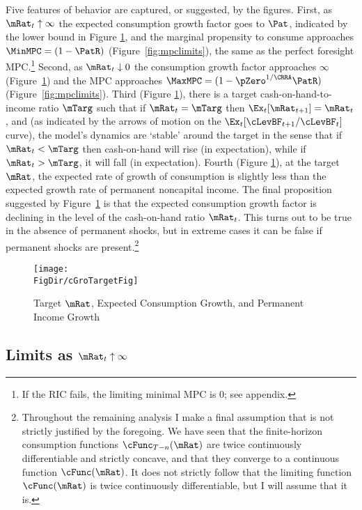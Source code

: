 \documentclass[titlepage]{\econtex}\providecommand{\texname}{BufferStockTheory}
\providecommand{\FigDir}{Figures}
\begin{document}
{Five features of behavior are captured, or suggested, by the
figures. First, as $\mRat_{t} \uparrow \infty$ the expected
consumption growth factor goes to ${\Pat}$, indicated by the lower
bound in Figure \ref{fig:cGroTargetFig}, and the marginal propensity
to consume approaches $\MinMPC=(1-\PatR)$
(Figure~\ref{fig:mpclimits}), the same as the perfect foresight MPC.\footnote{If the RIC fails, the limiting minimal MPC is 0; see appendix.}  Second, as $\mRat_t \downarrow 0$ the consumption
growth factor approaches $\infty$ (Figure~\ref{fig:cGroTargetFig}) and
the MPC approaches $\MaxMPC=(1-\pZero^{1/\CRRA}\PatR)$ (Figure~\ref{fig:mpclimits}).  Third (Figure
\ref{fig:cGroTargetFig}), there is a target cash-on-hand-to-income
ratio $\mTarg$ such that if $\mRat_t = \mTarg$ then $\Ex_t [
{\mRat}_{t+1}] = \mRat_t$, and (as indicated by the arrows of motion
on the $\Ex_{t}[\cLevBF_{t+1}/\cLevBF_{t}]$ curve), the model's dynamics
are `stable' around the target in the sense that if $\mRat_{t} <
\mTarg$ then cash-on-hand will rise (in expectation), while if
$\mRat_{t} > \mTarg$, it will fall (in expectation).  Fourth (Figure
\ref{fig:cGroTargetFig}), at the target $\mRat$, the expected rate of
growth of consumption is slightly less than the expected growth rate
of permanent noncapital income. The final proposition suggested by
Figure~\ref{fig:cGroTargetFig} is that the expected consumption growth
factor is declining in the level of the cash-on-hand ratio
$\mRat_{t}$.  This turns out to be true in the absence of permanent
shocks, but in extreme cases it can be false if permanent shocks are
present.\footnote{Throughout the remaining analysis I make a final
  assumption that is not strictly justified by the foregoing.  We have
  seen that the finite-horizon consumption functions
  $\cFunc_{T-n}(\mRat)$ are twice continuously differentiable and
  strictly concave, and that they converge to a continuous function
  $\cFunc(\mRat)$.  It does not strictly follow that the limiting
  function $\cFunc(\mRat)$ is twice continuously differentiable, but I
  will assume that it is.}

\renewcommand{\figFile}{cGroTargetFig}
\hypertarget{\figFile}{}
\begin{figure}[tbp]
\centerline{\texttt{[image: \\FigDir/cGroTargetFig]}}
\caption{Target $\mRat$, Expected Consumption Growth, and Permanent Income Growth}
\label{fig:cGroTargetFig}
\end{figure}

\hypertarget{LimitsAsmtToInfty}{}
\subsection{Limits as $\mRat_t \uparrow \infty$}

}
\end{document}
